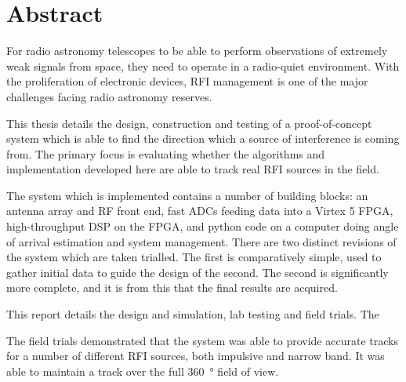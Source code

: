 \chapter{Abstract}

For radio astronomy telescopes to be able to perform observations of extremely weak signals from space, they need to operate in a radio-quiet environment. With the proliferation of electronic devices, RFI management is one of the major challenges facing radio astronomy reserves. 

This thesis details the design, construction and testing of a proof-of-concept system which is able to find the direction which a source of interference is coming from. The primary focus is evaluating whether the algorithms and implementation developed here are able to track real RFI sources in the field.

The system which is implemented contains a number of building blocks: an antenna array and RF front end, fast ADCs feeding data into a Virtex 5 FPGA, high-throughput DSP on the FPGA, and python code on a computer doing angle of arrival estimation and system management. 
There are two distinct revisions of the system which are taken trialled. The first is comparatively simple, used to gather initial data to guide the design of the second. The second is significantly more complete, and it is from this that the final results are acquired.

This report details the design and simulation, lab testing and field trials. The

The field trials demonstrated that the system was able to provide accurate tracks for a number of different RFI sources, both impulsive and narrow band. It was able to maintain a track over the full \SI{360}{\degree} field of view.
